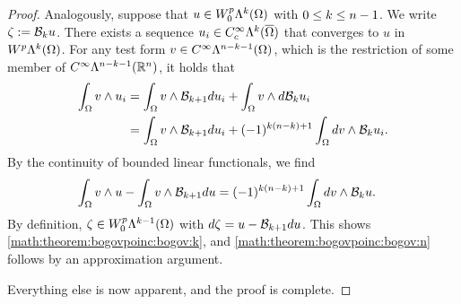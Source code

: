 \documentclass[10pt,a4paper]{article}
\begin{document}
\begin{proof}
    Analogously, suppose that $u \in W^{p}_{0}\Lambda^{k}(\Omega)$ with $0 \leq k \leq n-1$. 
    We write $\zeta := {\mathcal B}_{k} u$. 
    There exists a sequence $u_{i} \in C^{\infty}_{c}\Lambda^{k}(\overline\Omega)$ that converges to $u$ in $W^{p}\Lambda^{k}(\Omega)$. 
    For any test form $v \in C^{\infty}\Lambda^{n-k-1}(\Omega)$, 
    which is the restriction of some member of $C^{\infty}\Lambda^{n-k-1}({\mathbb R}^{n})$, 
    it holds that 
    \begin{align*}
        \int_{\Omega} v \wedge u_{i} 
        &=
        \int_{\Omega} v \wedge {\mathcal B}_{k+1} d u_{i}
        +
        \int_{\Omega} v \wedge d {\mathcal B}_{k  } u_{i}
        \\&=
        \int_{\Omega} v \wedge {\mathcal B}_{k+1} d u_{i}
        +
        (-1)^{k(n-k)+1}
        \int_{\Omega} d v \wedge {\mathcal B}_{k  } u_{i}
        .
    \end{align*}
    By the continuity of bounded linear functionals, we find 
    \begin{align*}
        \int_{\Omega} v \wedge u 
        -
        \int_{\Omega} v \wedge {\mathcal B}_{k+1} d u
        &=
        (-1)^{k(n-k)+1}
        \int_{\Omega} d v \wedge {\mathcal B}_{k  } u 
        .
    \end{align*}
    By definition, $\zeta \in W^{p}_{0}\Lambda^{k-1}(\Omega)$ with $d \zeta = u - {\mathcal B}_{k+1} d u$.
    This shows \eqref{math:theorem:bogovpoinc:bogov:k}, and \eqref{math:theorem:bogovpoinc:bogov:n} follows by an approximation argument.
    
    Everything else is now apparent, and the proof is complete. 
\begin{comment}
    It suffices to discuss the case $1 \leq p < \infty$, because the domain is bounded 
    and taking the limit will then imply the inequality with $p = \infty$. 
    The potential operators are linear and satisfy the stated bounds over $C^{\infty}_{c}\Alt^{\mia}(\Omega)$,
    which is a dense subspace of $L^{p}\Alt^{\mia}(\Omega)$. 

    \color{blue}
    Let $u \in W^{p}_{ }\Alt^{\mia}(\Omega)$ with $0 \leq \mia \leq n-1$ and set $w = \Poinc_{\mia} \cartan u$.
    There exists a sequence $u_{i} \in C^{\infty}\Alt^{\mia}(\overline\Omega)$ that converges to $u$ in $W^{p}\Alt^{\mia}(\Omega)$. 
    For any test form $v \in C^{\infty}_{c}\Alt^{n-\mia-1}(\Omega)$, we verify 
    \begin{align*}
        \int_{\Omega} \cartan v \wedge \Poinc_{\mia+1} \cartan u_{i}
        =
        \int_{\Omega} v \wedge \cartan \Poinc_{\mia+1} \cartan u_{i}
        =
        \int_{\Omega} v \wedge \cartan u_{i}
        .
    \end{align*}
    By the continuity of bounded linear functionals, we find 
    \begin{align*}
        \int_{\Omega} v \wedge \cartan u 
        &=
        (-1)^{\mia(n-\mia)+1}
        \int_{\Omega} \cartan v \wedge w
        .
    \end{align*}
    By definition, $w \in W^{p}\Alt^{\mia-1}(\Omega)$ with $\cartan w = u$.
    \color{black}
    

\end{comment}
\end{proof}
\end{document}
